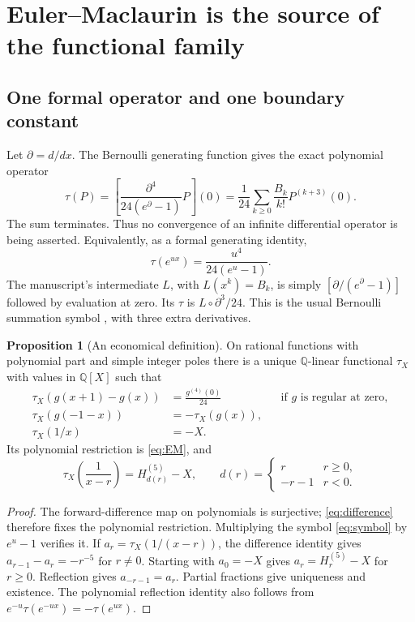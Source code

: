 \documentclass[11pt]{article}
\theoremstyle{definition}
\newtheorem{proposition}{Proposition}[section]
\theoremstyle{remark}\newtheorem*{remark}{Remark}
\newcommand{\Q}{\mathbb Q}
\begin{document}
\section{Euler--Maclaurin is the source of the functional family}

\subsection{One formal operator and one boundary constant}
Let $\partial=d/dx$. The Bernoulli generating function gives the exact polynomial
operator
\begin{equation}\label{eq:EM}
 \tau(P)=\left[\frac{\partial^4}{24(e^\partial-1)}P\right](0)
 =\frac1{24}\sum_{k\ge0}\frac{B_k}{k!}P^{(k+3)}(0).
\end{equation}
The sum terminates. Thus no convergence of an infinite differential operator is
being asserted. Equivalently, as a formal generating identity,
\begin{equation}\label{eq:symbol}
 \tau(e^{ux})=\frac{u^4}{24(e^u-1)}.
\end{equation}
The manuscript's intermediate $L$, with $L(x^k)=B_k$, is simply
$[\partial/(e^\partial-1)]$ followed by evaluation at zero. Its $\tau$ is
$L\circ\partial^3/24$. This is the usual Bernoulli summation symbol
\cite{Bernoulli}, with three extra derivatives.

\begin{proposition}[An economical definition]\label{prop:axioms}
On rational functions with polynomial part and simple integer poles there is a
unique $\Q$-linear functional $\tau_X$ with values in $\Q[X]$ such that
\begin{align}
 \tau_X(g(x+1)-g(x))&=\frac{g^{(4)}(0)}{24}
                  &&\text{if $g$ is regular at zero},\label{eq:difference}\\
 \tau_X(g(-1-x))&=-\tau_X(g(x)),\label{eq:reflection}\\
 \tau_X(1/x)&=-X.\label{eq:basepole}
\end{align}
Its polynomial restriction is \eqref{eq:EM}, and
\begin{equation}\label{eq:poles}
 \tau_X\!\left(\frac1{x-r}\right)=H^{(5)}_{d(r)}-X,
 \qquad d(r)=\begin{cases}r&r\ge0,\\-r-1&r<0.\end{cases}
\end{equation}
\end{proposition}
\begin{proof}
The forward-difference map on polynomials is surjective; \eqref{eq:difference}
therefore fixes the polynomial restriction. Multiplying the symbol
\eqref{eq:symbol} by $e^u-1$ verifies it. If
$a_r=\tau_X(1/(x-r))$, the difference identity gives
$a_{r-1}-a_r=-r^{-5}$ for $r\ne0$. Starting with $a_0=-X$ gives
$a_r=H_r^{(5)}-X$ for $r\ge0$. Reflection gives $a_{-r-1}=a_r$.
Partial fractions give uniqueness and existence. The polynomial reflection
identity also follows from $e^{-u}\tau(e^{-ux})=-\tau(e^{ux})$.
\end{proof}
\end{document}

